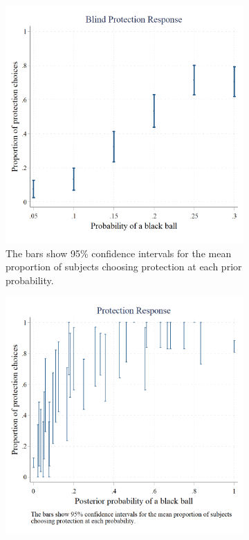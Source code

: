 \documentclass[12pt,a4paper]{article}
\begin{document}
\begin{figure}[H]
\centering
\caption{Average Protection Response} \label{fig:ProtResponse}
\begin{subfigure}[t]{.45\textwidth}
  \centering
\includegraphics[width=\textwidth]{Graphs/blind_prot_sta.png}
\caption{The bars show 95\% confidence intervals for the mean proportion of subjects choosing protection at each prior probability.}
\end{subfigure}
\begin{subfigure}[t]{.45\textwidth}
  \includegraphics[width=\textwidth]{Graphs/ip_response.png}

\end{subfigure}
\end{figure}
\end{document}

